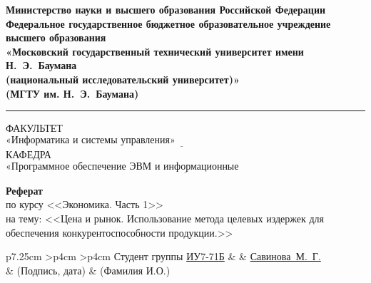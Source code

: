 \documentclass{bmstu}
\newenvironment{signstabular}[1][1]{
	\renewcommand*{\arraystretch}{#1}
	\tabular
}{
	\endtabular
}
\begin{document}
	\begin{titlepage}
		\fontsize{12pt}{12pt}\selectfont
		\noindent \begin{minipage}{0.15\textwidth}
		\end{minipage}
		\noindent\begin{minipage}{0.9\textwidth}\centering
			\textbf{Министерство науки и высшего образования Российской Федерации}\\
			\textbf{Федеральное государственное бюджетное образовательное учреждение высшего образования}\\
			\textbf{«Московский государственный технический университет имени Н.~Э.~Баумана}\\
			\textbf{(национальный исследовательский университет)»}\\
			\textbf{(МГТУ им. Н.~Э.~Баумана)}
		\end{minipage}
		
		\noindent\rule{18cm}{3pt}
		\newline\newline
		\noindent ФАКУЛЬТЕТ $\underline{\text{«Информатика и системы управления»~~~~~~~~~~~~~~~~~~~~~~~~~~~~~~~~~~~~~~~~~~~~~~~~~~~~~~~}}$ \newline\newline
		\noindent КАФЕДРА $\underline{\text{«Программное обеспечение ЭВМ и информационные технологии»~~~~~~~~~~~~~~~~~~~~~~~}}$\newline\newline\newline\newline\newline\newline\newline
		
		\begin{center}
			\textbf{\large Реферат} \\
			\large по курсу <<Экономика. Часть 1>> \\
			на тему: <<Цена и рынок. Использование метода целевых издержек для обеспечения конкурентоспособности продукции.>>
		\end{center}
		
		\vfill
		\vfill
		\vfill
		\vfill
		
		\begin{table}[h!]
			\fontsize{12pt}{0.7\baselineskip}\selectfont
			\centering
			\begin{signstabular}[0.7]{p{7.25cm} >{\centering\arraybackslash}p{4cm} >{\centering\arraybackslash}p{4cm}}
				Студент группы \uline{ИУ7-71Б} & \uline{\mbox{\hspace*{4cm}}} & \uline{\hfill Савинова~М.~Г. \hfill} \\
				& \scriptsize (Подпись, дата) & \scriptsize (Фамилия И.О.)
			\end{signstabular}
			

\end{table}
\end{titlepage}
\end{document}
